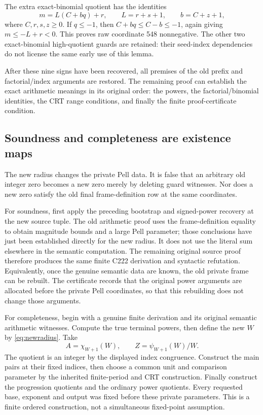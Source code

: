 The extra exact-binomial quotient has the identities
\[
m=L(C+bq)+r,\qquad L=r+s+1,\qquad b=C+z+1,
\]
where \(C,r,s,z\ge0\). If \(q\le-1\), then \(C+bq\le C-b\le-1\), again giving \(m\le-L+r<0\). This proves raw coordinate 548 nonnegative. The other two exact-binomial high-quotient guards are retained: their seed-index dependencies do not license the same early use of this lemma.

After these nine signs have been recovered, all premises of the old prefix and factorial/index arguments are restored. The remaining proof can establish the exact arithmetic meanings in its original order: the powers, the factorial/binomial identities, the CRT range conditions, and finally the finite proof-certificate condition.

\subsection{Soundness and completeness are existence maps}

The new radius changes the private Pell data. It is false that an arbitrary old integer zero becomes a new zero merely by deleting guard witnesses. Nor does a new zero satisfy the old final frame-definition row at the same coordinates.

For soundness, first apply the preceding bootstrap and signed-power recovery at the new source tuple. The old arithmetic proof uses the frame-definition equality to obtain magnitude bounds and a large Pell parameter; those conclusions have just been established directly for the new radius. It does not use the literal sum elsewhere in the semantic computation. The remaining original source proof therefore produces the same finite C222 derivation and syntactic refutation. Equivalently, once the genuine semantic data are known, the old private frame can be rebuilt. The certificate records that the original power arguments are allocated before the private Pell coordinates, so that this rebuilding does not change those arguments.

For completeness, begin with a genuine finite derivation and its original semantic arithmetic witnesses. Compute the true terminal powers, then define the new \(W\) by \eqref{eq:newradius}. Take
\[
A=\chi_{W+1}(W),\qquad Z=\psi_{W+1}(W)/W.
\]
The quotient is an integer by the displayed index congruence. Construct the main pairs at their fixed indices, then choose a common unit and comparison parameter by the inherited finite-period and CRT construction. Finally construct the progression quotients and the ordinary power quotients. Every requested base, exponent and output was fixed before these private parameters. This is a finite ordered construction, not a simultaneous fixed-point assumption.

